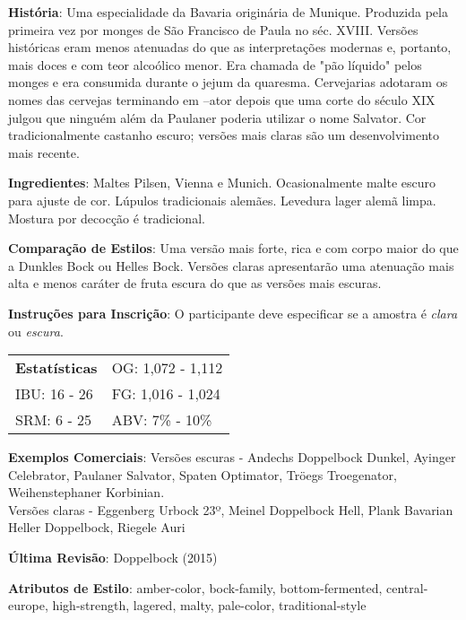 \textbf{História}: Uma especialidade da Bavaria originária de Munique. Produzida pela primeira vez por monges de São Francisco de Paula no séc. XVIII. Versões históricas eram menos atenuadas do que as interpretações modernas e, portanto, mais doces e com teor alcoólico menor. Era chamada de "pão líquido" pelos monges e era consumida durante o jejum da quaresma. Cervejarias adotaram os nomes das cervejas terminando em –ator depois que uma corte do século XIX julgou que ninguém além da Paulaner poderia utilizar o nome Salvator. Cor tradicionalmente castanho escuro; versões mais claras são um desenvolvimento mais recente.

\textbf{Ingredientes}: Maltes Pilsen, Vienna e Munich. Ocasionalmente malte escuro para ajuste de cor. Lúpulos tradicionais alemães. Levedura lager alemã limpa. Mostura por decocção é tradicional.

\textbf{Comparação de Estilos}: Uma versão mais forte, rica e com corpo maior do que a Dunkles Bock ou Helles Bock. Versões claras apresentarão uma atenuação mais alta e menos caráter de fruta escura do que as versões mais escuras.

\textbf{Instruções para Inscrição}: O participante deve especificar se a amostra é \textit{clara} ou \textit{escura}.

\begin{tabular}{@{}p{35mm}p{35mm}@{}}
  \textbf{Estatísticas} & OG: 1,072 - 1,112 \\
  IBU: 16 - 26 & FG: 1,016 - 1,024 \\
  SRM: 6 - 25 & ABV: 7\% - 10\%
\end{tabular}

\textbf{Exemplos Comerciais}: Versões escuras - Andechs Doppelbock Dunkel, Ayinger Celebrator, Paulaner Salvator, Spaten Optimator, Tröegs Troegenator, Weihenstephaner Korbinian.\\
Versões claras - Eggenberg Urbock 23º, Meinel Doppelbock Hell, Plank Bavarian Heller Doppelbock, Riegele Auri

\textbf{Última Revisão}: Doppelbock (2015)

\textbf{Atributos de Estilo}: amber-color, bock-family, bottom-fermented, central-europe, high-strength, lagered, malty, pale-color, traditional-style
